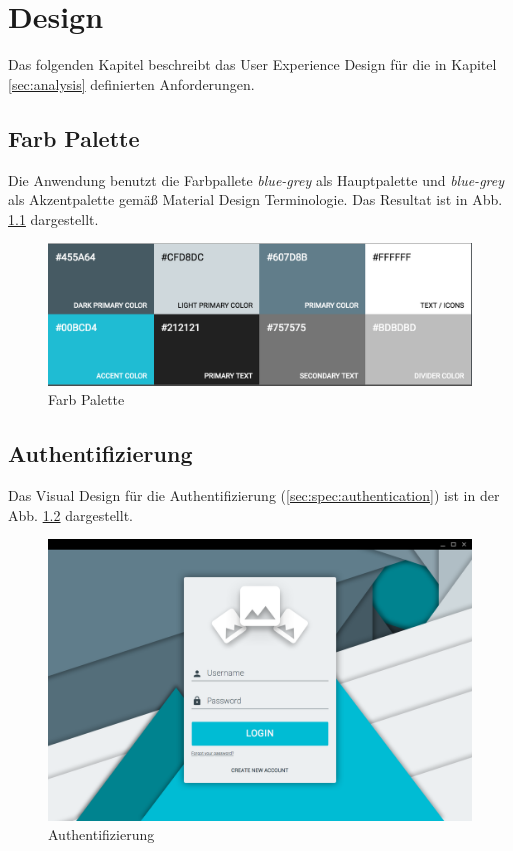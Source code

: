 \chapter{Design}

Das folgenden Kapitel beschreibt das User Experience Design für die in Kapitel \ref{sec:analysis} definierten Anforderungen.

\section{Farb Palette}

Die Anwendung benutzt die Farbpallete \textit{blue-grey} als Hauptpalette und \textit{blue-grey} als Akzentpalette gemäß Material Design Terminologie. Das Resultat ist in Abb. \ref{fig:color_palette} dargestellt.

\begin{figure}[htp]     %
\centering
\includegraphics[width=1.0\textwidth]{images/color_palette} 
\caption{Farb Palette}\label{fig:color_palette}
\end{figure}

\section{Authentifizierung}

Das Visual Design für die Authentifizierung (\ref{sec:spec:authentication}) ist in der Abb. \ref{fig:login_form} dargestellt.

\begin{figure}[htp]     %
\centering
\includegraphics[width=1.0\textwidth]{images/login_form} 
\caption{Authentifizierung}\label{fig:login_form}
\end{figure}

